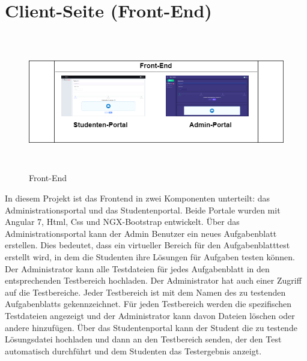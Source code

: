 \documentclass[a4paper,12pt,oneside]{book}
\begin{document}
\section{Client-Seite (Front-End)}
\begin{figure}[h!]
	\begin{center}
		\includegraphics[width=14cm, height=6cm]{FrontEnd.png}
		\caption{Front-End } 
		\label{ Front-End } 
	\end{center}
\end{figure}
In diesem Projekt ist das Frontend in zwei Komponenten unterteilt: das Administrationsportal und das Studentenportal. Beide Portale wurden mit Angular 7, Html, Css und NGX-Bootstrap entwickelt.
\newline
Über das Administrationsportal kann der Admin Benutzer ein neues Aufgabenblatt erstellen. Dies bedeutet, dass ein virtueller Bereich für den Aufgabenblatttest erstellt wird, in dem die Studenten ihre Lösungen für Aufgaben testen können. Der Administrator kann alle Testdateien für jedes Aufgabenblatt in den entsprechenden Testbereich hochladen. Der Administrator hat auch einer Zugriff auf die Testbereiche. Jeder Testbereich ist mit dem Namen des zu testenden Aufgabenblatts gekennzeichnet. Für jeden Testbereich werden die spezifischen Testdateien angezeigt und der Administrator kann davon Dateien löschen oder andere hinzufügen.
Über das Studentenportal kann der Student die zu testende Lösungsdatei hochladen und dann an den Testbereich senden, der den Test automatisch durchführt und dem Studenten das Testergebnis anzeigt.
\end{document}
